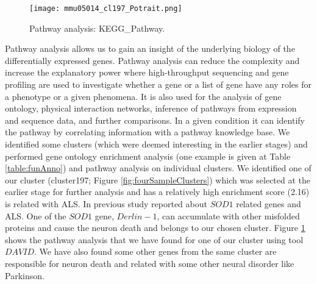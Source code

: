 \begin{figure}
 \begin{center}
 \texttt{[image: mmu05014\_cl197\_Potrait.png]}
\caption {Pathway analysis: KEGG\_Pathway. \label{pathwayAnalysis}}
 \end{center}
\end{figure}

Pathway analysis allows us to gain an insight of the underlying biology of the differentially expressed genes. Pathway analysis can reduce the complexity and increase the explanatory power where high-throughput sequencing and gene profiling are used to investigate whether a gene or a list of gene have any roles for a phenotype or a given phenomena. It is also used for the analysis of gene ontology, physical interaction networks, inference of pathways from expression and sequence data, and further comparisons. In a given condition it can identify the pathway by correlating information with a pathway knowledge base. We identified some clusters (which were deemed interesting in the earlier stages) and performed gene ontology enrichment analysis (one example is given at Table \ref{table:funAnno}) and pathway analysis on individual clusters.  We identified one of our cluster (cluster197; Figure \ref{fig:fourSampleClusters}) which was selected at the earlier stage for further analysis and has a relatively high enrichment score (2.16) is related with ALS.  In previous study \cite{Brockington:2013} reported about $SOD1$ related genes and ALS.  One of the $SOD1$ gene, $Derlin-1$, can accumulate with other misfolded proteins and cause the neuron death and belongs to our chosen cluster. Figure \ref{pathwayAnalysis} shows the pathway analysis that we have found for one of our cluster using tool $DAVID$.  We have also found some other genes from the same cluster are responsible for neuron death and related with some other neural disorder like Parkinson.

